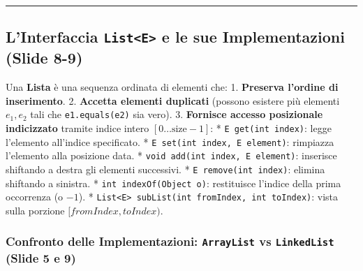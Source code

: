 \documentclass[11pt,a4paper,oneside]{report}
\newcommand{\passthrough}[1]{#1}
\begin{document}
\begin{center}\rule{0.5\linewidth}{0.5pt}\end{center}

\subsection{\texorpdfstring{L'Interfaccia
\texttt{List\textless{}E\textgreater{}} e le sue Implementazioni (Slide
8-9)}{L'Interfaccia List\textless E\textgreater{} e le sue Implementazioni (Slide 8-9)}}\label{chap15_linterfaccia-liste-e-le-sue-implementazioni-slide-8-9}

Una \textbf{Lista} è una sequenza ordinata di elementi che: 1.
\textbf{Preserva l'ordine di inserimento}. 2. \textbf{Accetta elementi
duplicati} (possono esistere più elementi \(e_1, e_2\) tali che
\passthrough{\lstinline!e1.equals(e2)!} sia vero). 3. \textbf{Fornisce
accesso posizionale indicizzato} tramite indice intero
\([0 \dots \text{size}-1]\): *
\passthrough{\lstinline!E get(int index)!}: legge l'elemento all'indice
specificato. * \passthrough{\lstinline!E set(int index, E element)!}:
rimpiazza l'elemento alla posizione data. *
\passthrough{\lstinline!void add(int index, E element)!}: inserisce
shiftando a destra gli elementi successivi. *
\passthrough{\lstinline!E remove(int index)!}: elimina shiftando a
sinistra. * \passthrough{\lstinline!int indexOf(Object o)!}: restituisce
l'indice della prima occorrenza (o \(-1\)). *
\passthrough{\lstinline!List<E> subList(int fromIndex, int toIndex)!}:
vista sulla porzione \([fromIndex, toIndex)\).

\subsubsection{\texorpdfstring{Confronto delle Implementazioni:
\texttt{ArrayList} vs \texttt{LinkedList} (Slide 5 e
9)}{Confronto delle Implementazioni: ArrayList vs LinkedList (Slide 5 e 9)}}\label{chap15_confronto-delle-implementazioni-arraylist-vs-linkedlist-slide-5-e-9}
\end{document}

